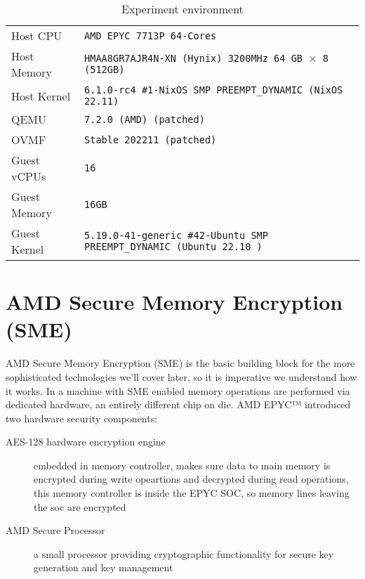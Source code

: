 \documentclass[twocolumn]{article}
\begin{document}
\begin{table*}
    \centering
    \label{tab:experiment-environment}
    \begin{tabular}{l|l}
        \hline
        Host CPU      & \texttt{AMD EPYC 7713P 64-Cores}                                            \\
        Host Memory   & \texttt{HMAA8GR7AJR4N-XN (Hynix) 3200MHz 64 GB $\times$ 8 (512GB)}          \\
        Host Kernel   & \texttt{6.1.0-rc4 \#1-NixOS SMP PREEMPT\_DYNAMIC (NixOS 22.11)}             \\
        QEMU          & \texttt{7.2.0 (AMD) (patched)}                                              \\
        OVMF          & \texttt{Stable 202211 (patched)}                                            \\
        Guest vCPUs   & \texttt{16}                                                                 \\
        Guest Memory  & \texttt{16GB}                                                               \\
        Guest Kernel  & \texttt{5.19.0-41-generic \#42-Ubuntu SMP PREEMPT\_DYNAMIC (Ubuntu 22.10 )} \\ 
        \hline
    \end{tabular}
    \caption{Experiment environment}
\end{table*}

\section{AMD Secure Memory Encryption (SME)}
AMD Secure Memory Encryption (SME) is the basic building block for the more sophisticated technologies we'll cover later, so it is imperative we understand how it works. In a machine with SME enabled memory operations are performed via dedicated hardware, an entirely different chip on die. AMD EPYC™ introduced two hardware security components:
\begin{description}
    \item [AES-128 hardware encryption engine] embedded in memory controller, makes sure data to main memory is encrypted during write opeartions and decrypted during read operations, this memory controller is inside the EPYC SOC, so memory lines leaving the soc are encrypted
    \item [AMD Secure Processor] a small processor providing cryptographic functionality for secure key generation and key management
\end{description}
\end{document}
